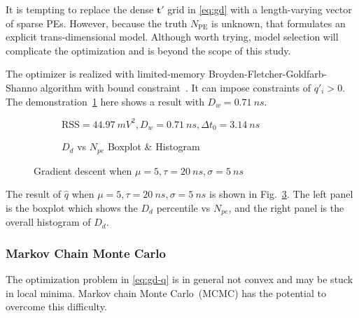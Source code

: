 It is tempting to replace the dense $\bm{t'}$ grid in \eqref{eq:gd} with a length-varying vector of sparse PEs. However, because the truth $N_\mathrm{PE}$ is unknown, that formulates an explicit trans-dimensional model.  Although worth trying, model selection will complicate the optimization and is beyond the scope of this study.

The optimizer is realized with limited-memory Broyden-Fletcher-Goldfarb-Shanno algorithm with bound constraint~\cite{byrd_limited_1995}.  It can impose constraints of $q'_i > 0$. The demonstration~\ref{fig:fitting} here shows a result with $D_w = \SI{0.71}{ns}$.

\begin{figure}[H]
  \begin{subfigure}{.5\textwidth}
    \centering
    \resizebox{\textwidth}{!}{}
    \caption{\label{fig:fitting}$\mathrm{RSS}=\SI{44.97}{mV^2},D_w=\SI{0.71}{ns},\Delta{t_0}=\SI{3.14}{ns}$}
  \end{subfigure}
  \begin{subfigure}{.5\textwidth}
    \centering
    \resizebox{\textwidth}{!}{}
    \caption{\label{fig:fitting-npe} $D_d$ vs $N_{pe}$ Boxplot \& Histogram}
  \end{subfigure}
  \caption{Gradient descent when $\mu=5, \tau=\SI{20}{ns}, \sigma=\SI{5}{ns}$}
\end{figure}

The result of $\hat{q}$ when $\mu=5, \tau=\SI{20}{ns}, \sigma=\SI{5}{ns}$ is shown in Fig.~\ref{fig:fitting-npe}. The left panel is the boxplot which shows the $D_d$ percentile vs $N_{pe}$, and the right panel is the overall histogram of $D_d$. 

\subsubsection{Markov Chain Monte Carlo}
The optimization problem in \eqref{eq:gd-q} is in general not convex and may be stuck in local minima.  Markov chain Monte Carlo~(MCMC) has the potential to overcome this difficulty.

